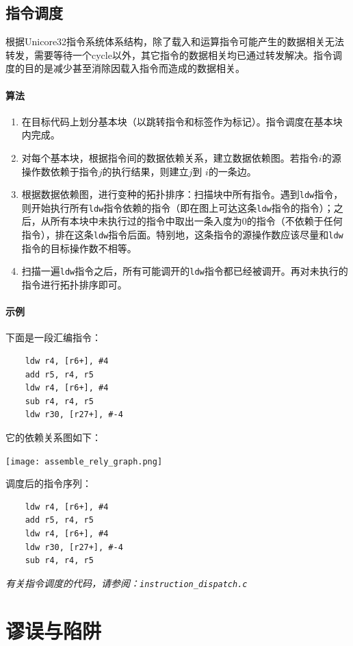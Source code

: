 \subsection{指令调度}
\label{assembledispatch}
根据Unicore32指令系统体系结构，除了载入和运算指令可能产生的数据相关无法转发，需要等待一个cycle以外，其它指令的数据相关均已通过转发解决。指令调度的目的是减少甚至消除因载入指令而造成的数据相关。

\paragraph*{算法}
\begin{enumerate}
	\item 在目标代码上划分基本块（以跳转指令和标签作为标记）。指令调度在基本块内完成。
	\item 对每个基本块，根据指令间的数据依赖关系，建立数据依赖图。若指令$i$的源操作数依赖于指令$j$的执行结果，则建立$j$到
$i$的一条边。
	\item 根据数据依赖图，进行变种的拓扑排序：扫描块中所有指令。遇到\verb|ldw|指令，则开始执行所有\verb|ldw|指令依赖的指令（即在图上可达这条\verb|ldw|指令的指令）；之后，从所有本块中未执行过的指令中取出一条入度为0的指令（不依赖于任何指令），排在这条\verb|ldw|指令后面。特别地，这条指令的源操作数应该尽量和\verb|ldw|指令的目标操作数不相等。
	\item 扫描一遍\verb|ldw|指令之后，所有可能调开的\verb|ldw|指令都已经被调开。再对未执行的指令进行拓扑排序即可。
\end{enumerate}
\paragraph*{示例}
下面是一段汇编指令：
\begin{verbatim}
	ldw	r4, [r6+], #4
	add	r5, r4, r5
	ldw	r4, [r6+], #4
	sub	r4, r4, r5
	ldw	r30, [r27+], #-4
\end{verbatim}
它的依赖关系图如下：
\begin{center}
	\texttt{[image: assemble\_rely\_graph.png]}
\end{center}
调度后的指令序列：
\begin{verbatim}
	ldw	r4, [r6+], #4
	add	r5, r4, r5
	ldw	r4, [r6+], #4
	ldw	r30, [r27+], #-4
	sub	r4, r4, r5
\end{verbatim}
{\it \anchor 有关指令调度的代码，请参阅：\verb|instruction_dispatch.c|}\\
\section{谬误与陷阱}
\label{tarpitc3}
